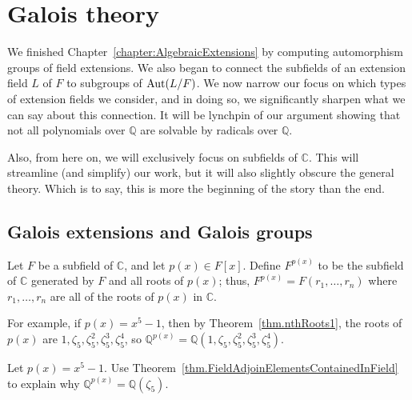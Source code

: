 \chapter{Galois theory}
\label{chapter:GaloisTheory}
\thispagestyle{empty}

We finished Chapter~\ref{chapter:AlgebraicExtensions} by computing automorphism groups of field extensions. We also began to connect the subfields of an extension  field $L$ of $F$ to subgroups of $\operatorname{Aut}(L/F)$.  We  now narrow our focus on which types of extension fields we consider, and in doing so, we significantly sharpen what we can say about this connection. It will be lynchpin of our argument showing that not all polynomials over $\mathbb{Q}$ are solvable by radicals over $\mathbb{Q}$.

Also, from here on, we will exclusively focus on subfields of $\mathbb{C}$. This will streamline (and simplify) our work, but it will also slightly obscure the general theory. Which is to say, this is more the beginning of the story than the end. 

\section{Galois extensions and Galois groups}

\begin{definition}\label{def.SplittingField}
Let $F$ be a subfield of $\mathbb{C}$, and let $p(x) \in F[x]$. Define $F^{p(x)}$ to be the subfield of $\mathbb{C}$ generated by $F$ and all roots of $p(x)$; thus,  $F^{p(x)}=F(r_1,\ldots,r_n)$ where $r_1,\ldots,r_n$ are all of the roots of $p(x)$ in $\mathbb{C}$.
\end{definition}

For example, if  $p(x) = x^5 - 1$, then by Theorem~\ref{thm.nthRoots1}, the roots of $p(x)$ are $1,\zeta_5,\zeta_5^2,\zeta_5^3,\zeta_5^4$, so $\mathbb{Q}^{p(x)}=\mathbb{Q}(1,\zeta_5,\zeta_5^2,\zeta_5^3,\zeta_5^4)$.

\begin{problem}\label{prob.QAdjoinZeta5IsGalois}
Let $p(x) = x^5 - 1$. Use Theorem~\ref{thm.FieldAdjoinElementsContainedInField} to explain why $\mathbb{Q}^{p(x)}=\mathbb{Q}(\zeta_5)$.
\end{problem}

